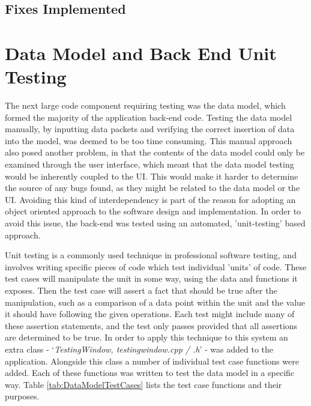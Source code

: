 \subsection{Fixes Implemented}


\section{Data Model and Back End Unit Testing} \label{BackEndUnitTesting}
The next large code component requiring testing was the data model, which formed the majority of the application back-end code. Testing the data model manually, by inputting data packets and verifying the correct insertion of data into the model, was deemed to be too time consuming. This manual approach also posed another problem, in that the contents of the data model could only be examined through the user interface, which meant that the data model testing would be inherently coupled to the UI. This would make it harder to determine the source of any bugs found, as they might be related to the data model or the UI. Avoiding this kind of interdependency is part of the reason for adopting an object oriented approach to the software design and implementation. In order to avoid this issue, the back-end was tested using an automated, 'unit-testing' based approach.

Unit testing is a commonly used technique in professional software testing, and involves writing specific pieces of code which test individual 'units' of code. These test cases will manipulate the unit in some way, using the data and functions it exposes. Then the test case will assert a fact that should be true after the manipulation, such as a comparison of a data point within the unit and the value it should have following the given operations. Each test might include many of these assertion statements, and the test only passes provided that all assertions are determined to be true. In order to apply this technique to this system an extra class - `\textit{TestingWindow, testingwindow.cpp / .h}' - was added to the application. Alongside this class a number of individual test case functions were added. Each of these functions was written to test the data model in a specific way. Table \ref{tab:DataModelTestCases} lists the test case functions and their purposes.


